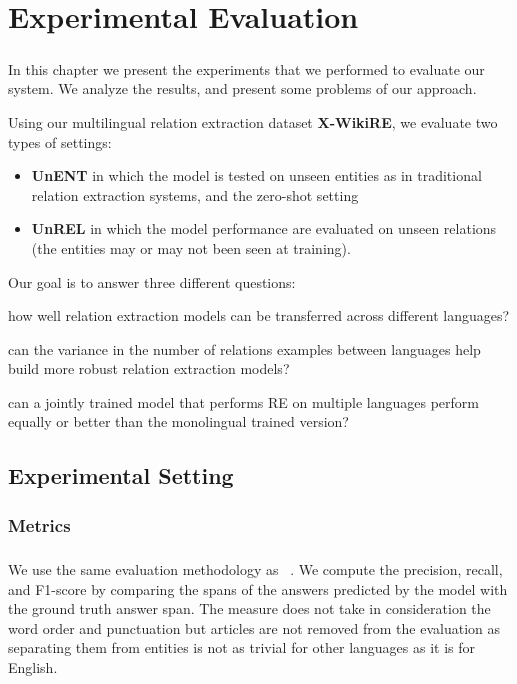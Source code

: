 \chapter{Experimental Evaluation}
\label{chpt:6}
\paragraph{}
In this chapter we present the experiments that we performed to evaluate our system. We analyze the results, and present some problems of our approach.


Using our multilingual relation extraction dataset \textbf{X-WikiRE}, we evaluate two types of settings:
\begin{itemize}
    \item \textbf{UnENT} in which the model is tested on unseen entities as in traditional relation extraction systems, and the zero-shot setting
    \item  \textbf{UnREL} in which the model performance are evaluated on unseen relations (the entities may or may not been seen at training).
\end{itemize}

Our goal is to answer three different questions: \begin{enumerate*}[a) , font=\bfseries]
    \item how well relation extraction models can be transferred across different languages?
    \item can the variance in the number of relations examples between languages help  build more robust relation extraction models?
    \item can a jointly trained model that performs RE on multiple languages perform equally or better than the monolingual trained version? 
\end{enumerate*}

\section{Experimental Setting}
\subsection{Metrics}
\paragraph{}
We use the same evaluation methodology as ~\cite{levy2017zero}. We compute the precision, recall, and F1-score by comparing the spans of the answers predicted by the model with the ground truth answer span. The measure does not take in consideration the word order and punctuation but articles are not removed from the evaluation as separating them from entities is not as trivial for other languages as it is for English.

